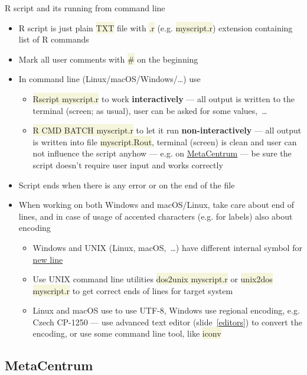 \documentclass[compress, ucs, xelatex, 11pt, xcolor=svgnames, aspectratio=169,
	hyperref={
		bookmarks=true,
		unicode=true,
		colorlinks=true,
		pdftitle={Molecular data in R},
		plainpages=false,
		pdfauthor={Vojtech Zeisek},
		pdfsubject={Course about phylogeny and evolution in R},
		pdfcreator={XeLaTeX},
		pdfkeywords={R, evolution, phylogeny, molecular data},
		linkcolor=Crimson, %
		anchorcolor=Magenta, %
		citecolor=Magenta, %
		filecolor=Magenta, %
		menucolor=Magenta, %
		urlcolor=DodgerBlue, %
		pdftex},
	url={hyphens, lowtilde} %
	]{beamer}
\renewcommand{\texttt}[1]{\colorbox{Beige}{{\ttfamily #1}}}
\begin{document}
\begin{frame}[allowframebreaks]{R script and its running from command line}
	\begin{itemize}
		\item R script is just plain \texttt{TXT} file with \texttt{.r} (e.g. \texttt{myscript.r}) extension containing list of R commands
		\item Mark all user comments with \texttt{\#} on the beginning
		\item In command line (Linux/macOS/Windows/\ldots) use
		\begin{itemize}
			\item \texttt{Rscript myscript.r} to work \textbf{interactively} --- all output is written to the terminal (screen; as usual), user can be asked for some values,~\ldots
			\item \texttt{R CMD BATCH myscript.r} to let it run \textbf{non-interactively} --- all output is written into file \texttt{myscript.Rout}, terminal (screen) is clean and user can not influence the script anyhow --- e.g. on \href{https://www.metacentrum.cz/}{MetaCentrum} --- be sure the script doesn't require user input and works correctly
		\end{itemize}
		\item Script ends when there is any error or on the end of the file
		\item When working on both Windows and macOS/Linux, take care about end of lines, and in case of usage of accented characters (e.g. for labels) also about encoding
		\begin{itemize}
			\item Windows and UNIX (Linux, macOS,~\ldots) have different internal symbol for \href{https://en.wikipedia.org/wiki/Newline}{new line}
			\item Use UNIX command line utilities \texttt{dos2unix myscript.r} or \texttt{unix2dos myscript.r} to get correct ends of lines for target system
			\item Linux and macOS use to use UTF-8, Windows use regional encoding, e.g. Czech CP-1250 --- use advanced text editor (slide~\ref{editors}) to convert the encoding, or use some command line tool, like \texttt{iconv}
		\end{itemize}
	\end{itemize}
\end{frame}

\subsection{MetaCentrum}
\end{document}

